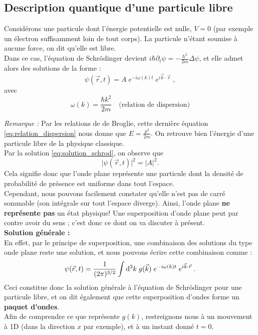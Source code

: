 \documentclass[12pt, a4paper]{book}
\begin{document}
\subsection{Description quantique d'une particule libre}
Considérons une particule dont l'énergie potentielle est nulle, $V=0$ (par exemple un électron suffisamment loin de tout corps). La particule n'étant soumise à aucune force, on dit qu'elle est libre.\\
Dans ce cas, l'équation de Schrödinger devient $i \hbar \partial_t \psi = -\frac{\hbar^2}{2m} \Delta \psi$, et elle admet alors des solutions de la forme : 
\begin{equation}\label{eq:solution_schrod}
\psi(\vec r, t) = A \; e^{-i\omega(k) t} \; e ^{i \vec k \cdot \vec r} \; ,
\end{equation}
avec 
\begin{equation}\label{eq:relation_dispersion}
\omega(k) = \dfrac{\hbar k^2}{2m} \quad \text{(relation de dispersion)}
\end{equation}

\textit{Remarque : } Par les relations de de Broglie, cette dernière équation \ref{eq:relation_dispersion} nous donne que $E = \frac{p^2}{2m}$. On retrouve bien l'énergie d'une particule libre de la physique classique. \\

Par la solution \ref{eq:solution_schrod}, on observe que $$ \lvert \psi(\vec{r},t) \rvert^2 = \lvert A \rvert^2 .$$
Cela signifie donc que l'onde plane représente une particule dont la densité de probabilité de présence est uniforme dans tout l'espace. \\
Cependant, nous pouvons facilement constater qu'elle n'est pas de carré sommable (son intégrale sur tout l'espace diverge). Ainsi, l'onde plane \textbf{ne représente pas} un état physique! Une superposition d'onde plane peut par contre avoir du sens ; c'est donc ce dont on va discuter à présent. \\

\textbf{Solution générale :} \\
En effet, par le principe de superposition, une combinaison des solutions du type onde plane reste une solution, et nous pouvons écrire cette combinaison comme : 
\begin{equation} \label{eq:schrod_sol_gen}
\psi(\vec r, t) = \dfrac{1}{(2\pi)^{3/2}} \int \mathrm{d} ^3 k \; g(\vec k) \; e^{-i\omega(k) t} \; e^{i\vec k \cdot \vec r} \; .
\end{equation}
Ceci constitue donc la solution générale à l'équation de Schrödinger pour une particule libre, et on dit également que cette superposition d'ondes forme un \textbf{paquet d'ondes}. \\
Afin de comprendre ce que représente $g(k)$, restreignons nous à un mouvement à 1D (dans la direction $x$ par exemple), et à un instant donné $t=0$.
\end{document}
